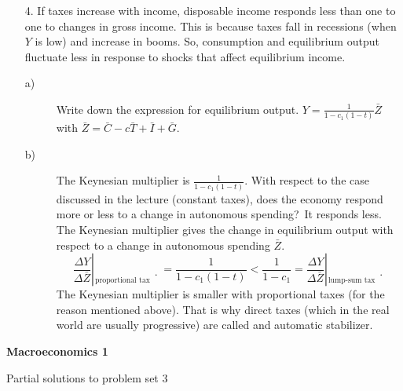 \documentclass[12pt,a4paper]{article}
\begin{document}
\begin{enumerate}




\item [4.] If taxes increase with income, disposable income responds less
  than one to one to changes in gross income. This is because taxes
  fall in recessions (when $Y$ is low) and increase in booms. So,
  consumption and equilibrium output fluctuate less in response to
  shocks that affect equilibrium income.

  \begin{description}
  \item [a)]Write down the expression for equilibrium output. $Y=\frac
    {1}{1-c_{1}(1-t)}\bar{Z}$ with
    $\bar{Z}=\bar{C}-c\bar{T}+\bar{I}+\bar{G}.$

  \item[b)] The Keynesian multiplier is $\frac{1}{1-c_{1}(1-t)}$. With
    respect to the case discussed in the lecture (constant taxes),
    does the economy respond more or less to a change in autonomous
    spending?\ It responds less.  The Keynesian multiplier gives the
    change in equilibrium output with respect to a change in
    autonomous spending $\bar{Z}.$
    \begin{equation}
      \frac{\Delta Y}{\Delta\bar{Z}}%
      \genfrac{|}{.}{0pt}{}{{}}{_{\text{proportional tax}}}%
      =\frac{1}{1-c_{1}(1-t)}<\frac{1}{1-c_{1}}=\frac{\Delta
        Y}{\Delta\bar{Z}}%
      \genfrac{|}{.}{0pt}{}{{}}{_{\text{lump-sum tax}}}%
    \end{equation}
    The Keynesian multiplier is smaller with proportional taxes (for
    the reason mentioned above). That is why direct taxes (which in
    the real world are usually progressive) are called and automatic
    stabilizer.
  \end{description}

\end{enumerate}
\newpage
\begin{center}
  \textbf{Macroeconomics 1}

  Partial solutions to problem set 3
\end{center}
\end{document}
